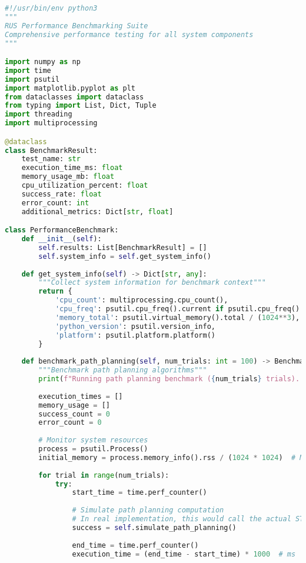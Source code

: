 \begin{lstlisting}[language=Python, caption={Performance Benchmark Script}, label={lst:app-benchmark-script}]
#!/usr/bin/env python3
"""
RUS Performance Benchmarking Suite
Comprehensive performance testing for all system components
"""

import numpy as np
import time
import psutil
import matplotlib.pyplot as plt
from dataclasses import dataclass
from typing import List, Dict, Tuple
import threading
import multiprocessing

@dataclass
class BenchmarkResult:
    test_name: str
    execution_time_ms: float
    memory_usage_mb: float
    cpu_utilization_percent: float
    success_rate: float
    error_count: int
    additional_metrics: Dict[str, float]

class PerformanceBenchmark:
    def __init__(self):
        self.results: List[BenchmarkResult] = []
        self.system_info = self.get_system_info()
        
    def get_system_info(self) -> Dict[str, any]:
        """Collect system information for benchmark context"""
        return {
            'cpu_count': multiprocessing.cpu_count(),
            'cpu_freq': psutil.cpu_freq().current if psutil.cpu_freq() else 'Unknown',
            'memory_total': psutil.virtual_memory().total / (1024**3),  # GB
            'python_version': psutil.version_info,
            'platform': psutil.platform.platform()
        }
    
    def benchmark_path_planning(self, num_trials: int = 100) -> BenchmarkResult:
        """Benchmark path planning algorithms"""
        print(f"Running path planning benchmark ({num_trials} trials)...")
        
        execution_times = []
        memory_usage = []
        success_count = 0
        error_count = 0
        
        # Monitor system resources
        process = psutil.Process()
        initial_memory = process.memory_info().rss / (1024 * 1024)  # MB
        
        for trial in range(num_trials):
            try:
                start_time = time.perf_counter()
                
                # Simulate path planning computation
                # In real implementation, this would call the actual STOMP planner
                success = self.simulate_path_planning()
                
                end_time = time.perf_counter()
                execution_time = (end_time - start_time) * 1000  # ms
                

\end{lstlisting}
